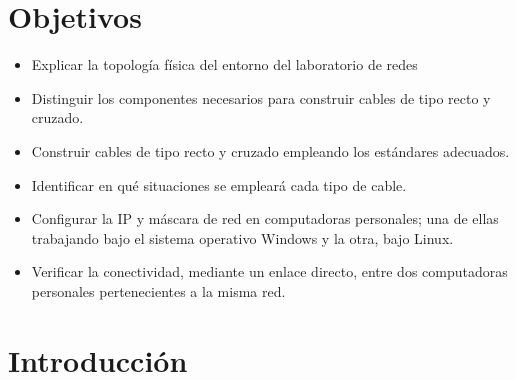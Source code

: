 \setcounter{page}{1}

\section{Objetivos}
    \begin{itemize}
        \item Explicar la topología física del entorno del laboratorio de redes
        \item Distinguir los componentes necesarios para construir cables de tipo recto y cruzado.
        \item Construir cables de tipo recto y cruzado empleando los estándares adecuados.
        \item Identificar en qué situaciones se empleará cada tipo de cable.
        \item Configurar la IP y máscara de red en computadoras personales; una de ellas trabajando bajo el sistema  operativo Windows y la otra, bajo Linux.
        \item Verificar la conectividad, mediante un enlace directo, entre dos computadoras personales pertenecientes a la misma red.
    \end{itemize}

\section{Introducción}



